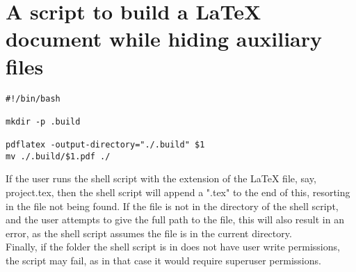 \documentclass{article}
\begin{document}
\section{A script to build a LaTeX document while hiding auxiliary files}
\lstset{language=bash, basicstyle=\ttfamily}
\begin{lstlisting}[caption={Content of shell script to compile LaTex documents}]
#!/bin/bash

mkdir -p .build

pdflatex -output-directory="./.build" $1
mv ./.build/$1.pdf ./
\end{lstlisting}
If the user runs the shell script with the extension of the LaTeX file, say, project.tex, then the shell script will append a ".tex" to the end of this, resorting in the file not being found. If the file is not in the directory of the shell script, and the user attempts to give the full path to the file, this will also result in an error, as the shell script assumes the file is in the current directory.\\

Finally, if the folder the shell script is in does not have user write permissions, the script may fail, as in that case it would require superuser permissions.
\end{document}
